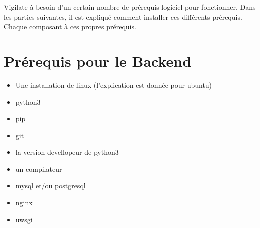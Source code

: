 Vigilate à besoin d’un certain nombre de prérequis logiciel pour fonctionner. Dans les parties suivantes, il est expliqué comment installer ces différents prérequis. Chaque composant à ces propres prérequis.

\section{Prérequis pour le Backend}

\begin{itemize}
\item Une installation de linux (l’explication est donnée pour ubuntu)
\item python3
\item pip
\item git
\item la version devellopeur de python3
\item un compilateur
\item mysql et/ou postgresql
\item nginx
\item uwsgi
\end{itemize}

